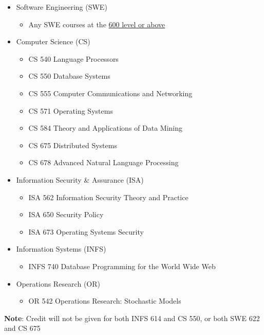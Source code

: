 \documentclass[oneside,11pt]{memoir}
\begin{document}
\begin{itemize} 
\item Software Engineering (SWE)
\begin{itemize}
    \item Any SWE courses at the \href{https://catalog.gmu.edu/courses/swe/}{600 level or above}
\end{itemize}
\item Computer Science (CS)

\begin{itemize}
    \item CS 540 Language Processors
    \item CS 550 Database Systems
    \item CS 555 Computer Communications and Networking
    \item CS 571 Operating Systems
    \item CS 584 Theory and Applications of Data Mining
    \item CS 675 Distributed Systems
    \item CS 678 Advanced Natural Language Processing
\end{itemize}

\item Information Security \& Assurance (ISA)

\begin{itemize}
    \item ISA 562 Information Security Theory and Practice
    \item ISA 650 Security Policy
    \item ISA 673 Operating Systems Security
\end{itemize}

\item Information Systems (INFS)
\begin{itemize}
    \item INFS 740 Database Programming for the World Wide Web
\end{itemize}

\item Operations Research (OR)
\begin{itemize}
    \item OR 542 Operations Research: Stochastic Models
\end{itemize}

\end{itemize}

\textbf{Note}: Credit will not be given for both INFS 614 and CS 550, or both SWE 622 and CS 675
\end{document}
